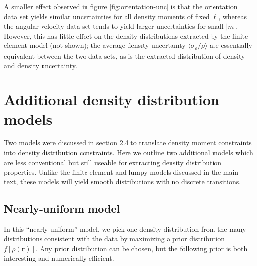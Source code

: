 \documentclass[9pt,twocolumn]{article}
\numberwithin{equation}{section}
\begin{document}
A smaller effect observed in figure \ref{fig:orientation-unc} is that the orientation data set yields similar uncertainties for all density moments of fixed $\ell$, whereas the angular velocity data set tends to yield larger uncertainties for small $|m|$. However, this has little effect on the density distributions extracted by the finite element model (not shown); the average density uncertainty $\langle \sigma_\rho / \rho \rangle$ are essentially equivalent between the two data sets, as is the extracted distribution of density and density uncertainty.




\section{Additional density distribution models}
\label{app:more-models}

Two models were discussed in section 2.4 to translate density moment constraints into density distribution constraints. Here we outline two additional models which are less conventional but still useable for extracting density distribution properties. Unlike the finite element and lumpy models discussed in the main text, these models will yield smooth distributions with no discrete transitions.

\subsection{Nearly-uniform model}
In this ``nearly-uniform'' model, we pick one density distribution from the many distributions consistent with the data by maximizing a prior distribution $f[\rho(\bm r)]$. Any prior distribution can be chosen, but the following prior is both interesting and numerically efficient.
\end{document}
